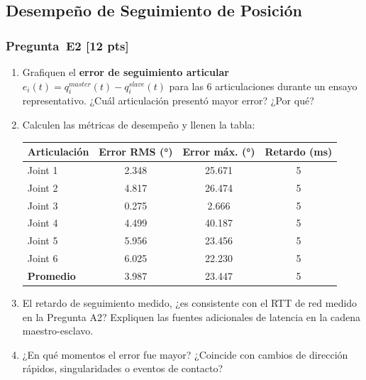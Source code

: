 \documentclass[journal,10pt,twoside]{IEEEtran}
\newcommand{\pts}[1]{\textbf{\color{tec_red}[#1 pts]}}
\begin{document}
\subsection{Desempeño de Seguimiento de Posición}

\subsubsection*{Pregunta~E2 \pts{12}}
\begin{enumerate}[label=(\alph*)]
  \item Grafiquen el \textbf{error de seguimiento articular}
        $e_i(t) = q_i^{master}(t) - q_i^{slave}(t)$ para
        las 6 articulaciones durante un ensayo representativo.
        ¿Cuál articulación presentó mayor error? ¿Por qué?
  \item Calculen las métricas de desempeño y llenen la tabla:

  \begin{center}
  \small
  \begin{tabular}{lccc}
    \toprule
    \textbf{Articulación} & \textbf{Error RMS (°)} & \textbf{Error máx. (°)} & \textbf{Retardo (ms)} \\
    \midrule
    Joint 1 & 2.348 & 25.671 & 5 \\
    Joint 2 & 4.817 & 26.474 & 5 \\
    Joint 3 & 0.275 &  2.666 & 5 \\
    Joint 4 & 4.499 & 40.187 & 5 \\
    Joint 5 & 5.956 & 23.456 & 5 \\
    Joint 6 & 6.025 & 22.230 & 5 \\
    \midrule
    \textbf{Promedio} & 3.987 & 23.447 & 5 \\
    \bottomrule
\end{tabular}
  \end{center}

  \item El retardo de seguimiento medido, ¿es consistente con el RTT
        de red medido en la Pregunta A2? Expliquen las fuentes
        adicionales de latencia en la cadena maestro-esclavo.
  \item ¿En qué momentos el error fue mayor? ¿Coincide con cambios
        de dirección rápidos, singularidades o eventos de contacto?
\end{enumerate}
\end{document}
